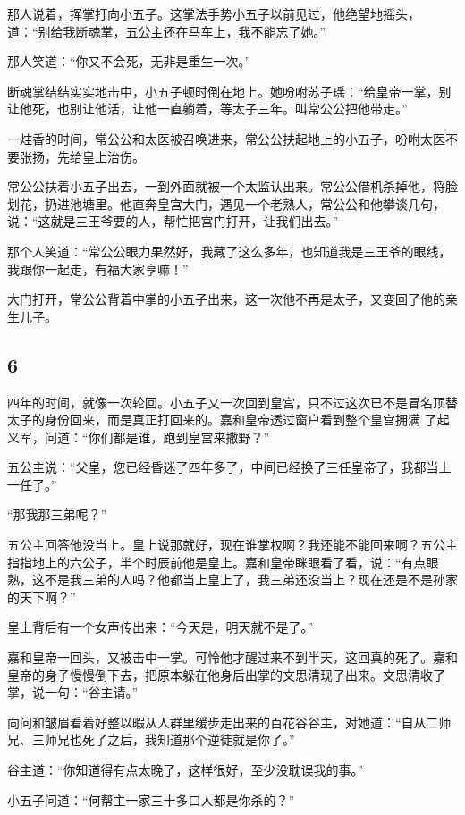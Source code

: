 那人说着，挥掌打向小五子。这掌法手势小五子以前见过，他绝望地摇头，道：“别给我断魂掌，五公主还在马车上，我不能忘了她。”

那人笑道：“你又不会死，无非是重生一次。”

断魂掌结结实实地击中，小五子顿时倒在地上。她吩咐苏子瑶：“给皇帝一掌，别让他死，也别让他活，让他一直躺着，等太子三年。叫常公公把他带走。”

一炷香的时间，常公公和太医被召唤进来，常公公扶起地上的小五子，吩咐太医不要张扬，先给皇上治伤。

常公公扶着小五子出去，一到外面就被一个太监认出来。常公公借机杀掉他，将脸划花，扔进池塘里。他直奔皇宫大门，遇见一个老熟人，常公公和他攀谈几句，说：“这就是三王爷要的人，帮忙把宫门打开，让我们出去。”

那个人笑道：“常公公眼力果然好，我藏了这么多年，也知道我是三王爷的眼线，我跟你一起走，有福大家享嘛！”

大门打开，常公公背着中掌的小五子出来，这一次他不再是太子，又变回了他的亲生儿子。
\newline

{\centering\subsection{6}}

四年的时间，就像一次轮回。小五子又一次回到皇宫，只不过这次已不是冒名顶替太子的身份回来，而是真正打回来的。嘉和皇帝透过窗户看到整个皇宫拥满
了起义军，问道：“你们都是谁，跑到皇宫来撒野？”

五公主说：“父皇，您已经昏迷了四年多了，中间已经换了三任皇帝了，我都当上一任了。”

“那我那三弟呢？”

五公主回答他没当上。皇上说那就好，现在谁掌权啊？我还能不能回来啊？五公主指指地上的六公子，半个时辰前他是皇上。嘉和皇帝眯眼看了看，说：“有点眼熟，这不是我三弟的人吗？他都当上皇上了，我三弟还没当上？现在还是不是孙家的天下啊？”

皇上背后有一个女声传出来：“今天是，明天就不是了。”

嘉和皇帝一回头，又被击中一掌。可怜他才醒过来不到半天，这回真的死了。嘉和皇帝的身子慢慢倒下去，把原本躲在他身后出掌的文思清现了出来。文思清收了掌，说一句：“谷主请。”

向问和皱眉看着好整以暇从人群里缓步走出来的百花谷谷主，对她道：“自从二师兄、三师兄也死了之后，我知道那个逆徒就是你了。”

谷主道：“你知道得有点太晚了，这样很好，至少没耽误我的事。”

小五子问道：“何帮主一家三十多口人都是你杀的？”

